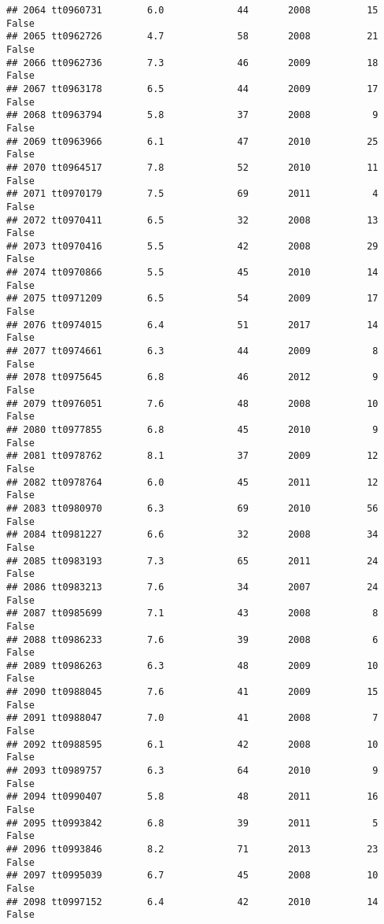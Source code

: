 \documentclass[
]{article}
\begin{document}
\begin{verbatim}
## 2064 tt0960731        6.0             44       2008          15   False
## 2065 tt0962726        4.7             58       2008          21   False
## 2066 tt0962736        7.3             46       2009          18   False
## 2067 tt0963178        6.5             44       2009          17   False
## 2068 tt0963794        5.8             37       2008           9   False
## 2069 tt0963966        6.1             47       2010          25   False
## 2070 tt0964517        7.8             52       2010          11   False
## 2071 tt0970179        7.5             69       2011           4   False
## 2072 tt0970411        6.5             32       2008          13   False
## 2073 tt0970416        5.5             42       2008          29   False
## 2074 tt0970866        5.5             45       2010          14   False
## 2075 tt0971209        6.5             54       2009          17   False
## 2076 tt0974015        6.4             51       2017          14   False
## 2077 tt0974661        6.3             44       2009           8   False
## 2078 tt0975645        6.8             46       2012           9   False
## 2079 tt0976051        7.6             48       2008          10   False
## 2080 tt0977855        6.8             45       2010           9   False
## 2081 tt0978762        8.1             37       2009          12   False
## 2082 tt0978764        6.0             45       2011          12   False
## 2083 tt0980970        6.3             69       2010          56   False
## 2084 tt0981227        6.6             32       2008          34   False
## 2085 tt0983193        7.3             65       2011          24   False
## 2086 tt0983213        7.6             34       2007          24   False
## 2087 tt0985699        7.1             43       2008           8   False
## 2088 tt0986233        7.6             39       2008           6   False
## 2089 tt0986263        6.3             48       2009          10   False
## 2090 tt0988045        7.6             41       2009          15   False
## 2091 tt0988047        7.0             41       2008           7   False
## 2092 tt0988595        6.1             42       2008          10   False
## 2093 tt0989757        6.3             64       2010           9   False
## 2094 tt0990407        5.8             48       2011          16   False
## 2095 tt0993842        6.8             39       2011           5   False
## 2096 tt0993846        8.2             71       2013          23   False
## 2097 tt0995039        6.7             45       2008          10   False
## 2098 tt0997152        6.4             42       2010          14   False

\end{verbatim}
\end{document}
